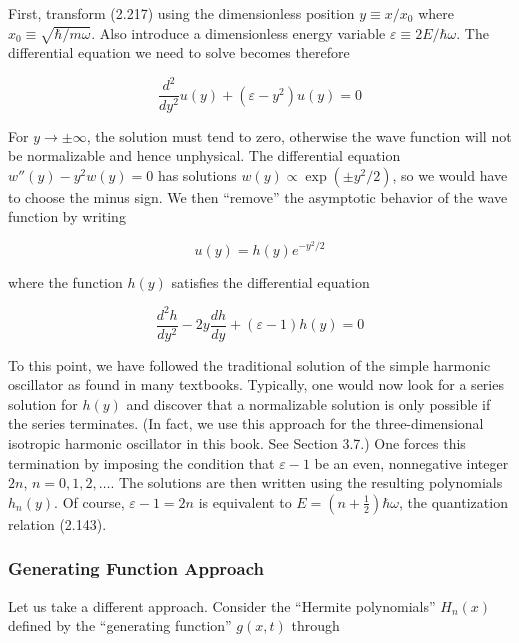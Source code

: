 \documentclass[11pt,a4paper]{article}
\begin{document}
First, transform (2.217) using the dimensionless position $y \equiv x/x_0$ where $x_0 \equiv \sqrt{\hbar/m\omega}$. Also introduce a dimensionless energy variable $\varepsilon \equiv 2E/\hbar\omega$. The differential equation we need to solve becomes therefore

\begin{equation}
\frac{d^2}{dy^2}u(y) + (\varepsilon - y^2)u(y) = 0
\tag{2.218}
\end{equation}

For $y \to \pm\infty$, the solution must tend to zero, otherwise the wave function will not be normalizable and hence unphysical. The differential equation $w''(y) - y^2 w(y) = 0$ has solutions $w(y) \propto \exp(\pm y^2/2)$, so we would have to choose the minus sign. We then ``remove'' the asymptotic behavior of the wave function by writing

\begin{equation}
u(y) = h(y)e^{-y^2/2}
\tag{2.219}
\end{equation}

where the function $h(y)$ satisfies the differential equation

\begin{equation}
\frac{d^2 h}{dy^2} - 2y\frac{dh}{dy} + (\varepsilon - 1)h(y) = 0
\tag{2.220}
\end{equation}

To this point, we have followed the traditional solution of the simple harmonic oscillator as found in many textbooks. Typically, one would now look for a series solution for $h(y)$ and discover that a normalizable solution is only possible if the series terminates. (In fact, we use this approach for the three-dimensional isotropic harmonic oscillator in this book. See Section 3.7.) One forces this termination by imposing the condition that $\varepsilon - 1$ be an even, nonnegative integer $2n$, $n = 0, 1, 2, \ldots$. The solutions are then written using the resulting polynomials $h_n(y)$. Of course, $\varepsilon - 1 = 2n$ is equivalent to $E = (n + \frac{1}{2})\hbar\omega$, the quantization relation (2.143).

\subsubsection{Generating Function Approach}

Let us take a different approach. Consider the ``Hermite polynomials'' $H_n(x)$ defined by the ``generating function'' $g(x, t)$ through
\end{document}
